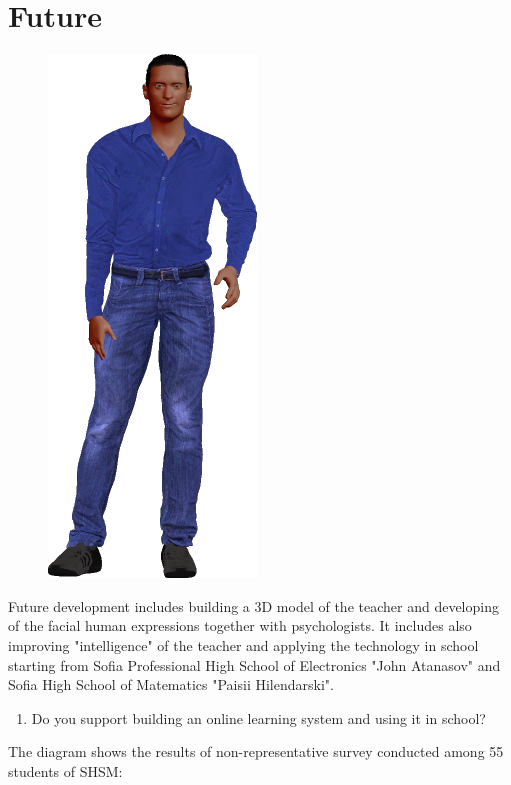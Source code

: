 \documentclass[a4paper, 12pt]{article}
\newenvironment{myblocksecond}[1]{%
	\tcolorbox[beamer,%
	noparskip,breakable,
	colback=Yellow,colframe=Brown,%
	colbacklower=Brown!75!Yellow,%
	title=#1]}%
{\endtcolorbox}
\begin{document}
	\section{Future}
	\begin{figure}
		\includegraphics[scale=0.35]{../bad_boy.png}
	\end{figure}
	Future development includes building a 3D model of the teacher and developing of the facial human expressions together with psychologists. 
	It includes also improving "intelligence" of the teacher and applying the technology in school starting from Sofia Professional High School of Electronics "John Atanasov" and Sofia High School of Matematics "Paisii Hilendarski". \\ \vspace{0.5cm}
	\begin{center}
		\begin{myblocksecond}{Survey questions}
			\begin{enumerate}
				\item Do you support building an online learning system and using it in school?
			\end{enumerate}
		\end{myblocksecond}
	\end{center}
	The diagram shows the results of non-representative survey conducted among 55 students of SHSM: \\
	\begin{center}
	\end{center}
\end{document}
